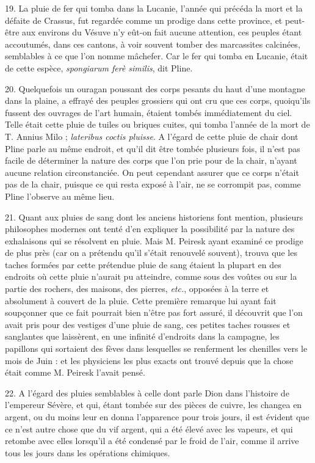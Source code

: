 \documentclass[a4paper, 11pt, oneside, polutonikogreek, french]{article}
\begin{document}
19. La pluie de fer qui tomba dans la Lucanie, l'année qui précéda la mort et la défaite de Crassus, fut regardée comme un prodige dans cette province, et peut-être aux environs du Vésuve n'y eût-on fait aucune attention, ces peuples étant accoutumés, dans ces cantons, à voir souvent tomber des marcassites calcinées, semblables à ce que l'on nomme mâchefer. Car le fer qui tomba en Lucanie, était de cette espèce, \emph{spongiarum ferè similis}, dit Pline.

20. Quelquefois un ouragan poussant des corps pesants du haut d'une montagne dans la plaine, a effrayé des peuples grossiers qui ont cru que ces corps, quoiqu'ils fussent des ouvrages de l'art humain, étaient tombés immédiatement du ciel. Telle était cette pluie de tuiles ou briques cuites, qui tomba l'année de la mort de T. Annius Milo ; \emph{lateribus coctis pluisse}. A l'égard de cette pluie de chair dont Pline parle au même endroit, et qu'il dit être tombée plusieurs fois, il n'est pas facile de déterminer la nature des corps que l'on prie pour de la chair, n'ayant aucune relation circonstanciée. On peut cependant assurer que ce corps n'était pas de la chair, puisque ce qui resta exposé à l'air, ne se corrompit pas, comme Pline l'observe au même lieu.

21. Quant aux pluies de sang dont les anciens historiens font mention, plusieurs philosophes modernes ont tenté d'en expliquer la possibilité par la nature des exhalaisons qui se résolvent en pluie. Mais M. Peiresk ayant examiné ce prodige de plus près (car on a prétendu qu'il s'était renouvelé souvent), trouva que les taches formées par cette prétendue pluie de sang étaient la plupart en des endroits où cette pluie n'aurait pu atteindre, comme sous des voûtes ou sur la partie des rochers, des maisons, des pierres, \emph{etc.}, opposées à la terre et absolument à couvert de la pluie. Cette première remarque lui ayant fait soupçonner que ce fait pourrait bien n'être pas fort assuré, il découvrit que l'on avait pris pour des vestiges d'une pluie de sang, ces petites taches rousses et sanglantes que laissèrent, en une infinité d'endroits dans la campagne, les papillons qui sortaient des fèves dans lesquelles se renferment les chenilles vers le mois de Juin : et les physiciens les plus exacts ont trouvé depuis que la chose était comme M. Peiresk l'avait pensé.

22. A l'égard des pluies semblables à celle dont parle Dion dans l'histoire de l'empereur Sévère, et qui, étant tombée sur des pièces de cuivre, les changea en argent, ou du moins leur en donna l'apparence pour trois jours, il est évident que ce n'est autre chose que du vif argent, qui a été élevé avec les vapeurs, et qui retombe avec elles lorsqu'il a été condensé par le froid de l'air, comme il arrive tous les jours dans les opérations chimiques.
\end{document}

